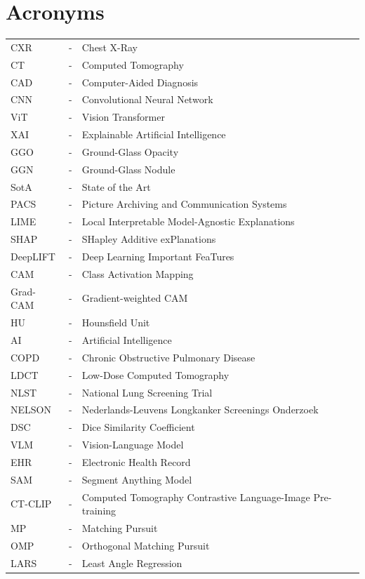 \chapter*{Acronyms}

\noindent \begin{tabular}{lcl}
CXR	& - & Chest X-Ray\\
CT  & - & Computed Tomography\\
CAD	& - & Computer-Aided Diagnosis\\
CNN & - & Convolutional Neural Network\\
ViT & - & Vision Transformer\\
XAI & - & Explainable Artificial Intelligence\\
GGO & - & Ground-Glass Opacity\\
GGN & - & Ground-Glass Nodule\\
SotA & - & State of the Art\\
PACS & - & Picture Archiving and Communication Systems\\
LIME & - & Local Interpretable Model-Agnostic Explanations\\
SHAP & - & SHapley Additive exPlanations\\
DeepLIFT & - & Deep Learning Important FeaTures\\
CAM & - & Class Activation Mapping\\
Grad-CAM & - & Gradient-weighted CAM\\
HU & - & Hounsfield Unit\\
AI & - & Artificial Intelligence\\
COPD & - & Chronic Obstructive Pulmonary Disease\\
LDCT & - & Low-Dose Computed Tomography\\
NLST & - & National Lung Screening Trial\\
NELSON & - & Nederlands-Leuvens Longkanker Screenings Onderzoek\\
DSC & - & Dice Similarity Coefficient\\
VLM & - & Vision-Language Model\\
EHR & - & Electronic Health Record\\
SAM & - & Segment Anything Model\\
CT-CLIP & - & Computed Tomography Contrastive Language-Image Pre-training\\
MP & - & Matching Pursuit\\
OMP & - & Orthogonal Matching Pursuit\\
LARS & - & Least Angle Regression\\

\end{tabular}
